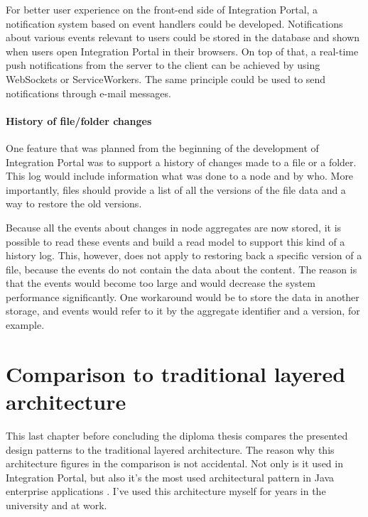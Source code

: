 \documentclass{book}
\begin{document}
For better user experience on the front-end side of Integration Portal,
a notification system based on event handlers could be developed.
Notifications about various events relevant to users could be stored in
the database and shown when users open Integration Portal in their
browsers. On top of that, a real-time push notifications from the server
to the client can be achieved by using WebSockets or ServiceWorkers. The
same principle could be used to send notifications through e-mail
messages.

\paragraph{History of file/folder
changes}\label{history-of-filefolder-changes}

One feature that was planned from the beginning of the development of
Integration Portal was to support a history of changes made to a file or
a folder. This log would include information what was done to a node and
by who. More importantly, files should provide a list of all the
versions of the file data and a way to restore the old versions.

Because all the events about changes in node aggregates are now stored,
it is possible to read these events and build a read model to support
this kind of a history log. This, however, does not apply to restoring
back a specific version of a file, because the events do not contain the
data about the content. The reason is that the events would become too
large and would decrease the system performance significantly. One
workaround would be to store the data in another storage, and events
would refer to it by the aggregate identifier and a version, for
example.


\section{Comparison to traditional layered
architecture}\label{comparison-to-traditional-layered-architecture}

This last chapter before concluding the diploma thesis compares the
presented design patterns to the traditional layered architecture. The
reason why this architecture figures in the comparison is not
accidental. Not only is it used in Integration Portal, but also it's the
most used architectural pattern in Java enterprise applications
\cite{oreilly}. I've used this architecture myself for years in the
university and at work.
\end{document}

